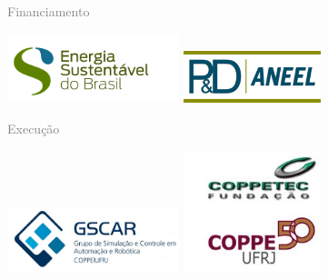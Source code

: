 %
%
%
%
\pagestyle{fancy}%
\thispagestyle{fancy}%
\renewcommand{\headrulewidth}  {0.4pt}%
\renewcommand{\footrulewidth}  {0.4pt}%
%
\chead{}%
\rhead{}%
\lfoot{}%
\cfoot{}%
\rfoot{\sf [\hours] \quad \today}%
\vspace*{20mm}%

{\grande \textcolor{gray}{Financiamento}}

\vspace{-25mm}%
\hspace{50mm}%
\includegraphics[width=50mm]{logo/esbr-logo.png}
\hspace{10mm}%
\includegraphics[width=40mm]{logo/aneel-logo.jpg}

\vspace{35mm}%
{\grande \textcolor{gray}{Execução}}

\vspace{-25mm}%
\hspace{50mm}%
\includegraphics[width=50mm]{logo/gscar-logo.png}
\hspace{10mm}%
\includegraphics[width=40mm]{logo/coppetec50-logo.jpg}

